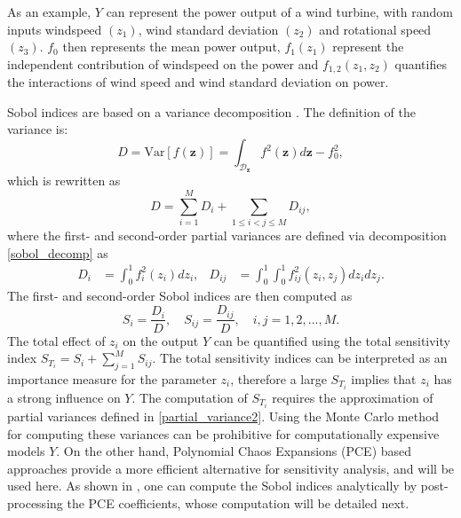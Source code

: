 As an example, $Y$ can represent the power output of a wind turbine, with random inputs windspeed $(z_1)$, wind standard deviation $(z_2)$ and rotational speed $(z_3)$. $f_0$ then represents the mean power output, $f_1(z_1)$ represent the independent contribution of windspeed on the power and $f_{1,2}(z_1,z_2)$ quantifies the interactions of wind speed and wind standard deviation on power. 

Sobol indices are based on a variance decomposition \cite{SOBOL2001271}. The definition of the variance is:
\begin{equation}\label{tot_var}
D = \text{Var}[f(\mathbf{z})] = \int_{\mathcal{D}_{\mathbf{z}}} f^2(\mathbf{z})d\mathbf{z} - f_0^2,
\end{equation}
which is rewritten as
\begin{equation}
D = \sum_{i=1}^M D_i + \sum_{1\leq i<j\leq M} D_{ij},
\end{equation}
where the first- and second-order partial variances are defined via decomposition \eqref{sobol_decomp} as
\begin{align}
D_i &= \int_{0}^{1} f^2_i(z_i)dz_i, & D_{ij} &= \int_{0}^{1} \int_{0}^{1} f^2_{ij}(z_i,z_j)dz_idz_j \label{partial_variance2}. 
\end{align}
The first- and second-order Sobol indices are then computed as
\begin{equation}\label{sobol_ind}
S_i = \frac{D_i}{D}, \quad S_{ij} = \frac{D_{ij}}{D}, \quad i,j=1,2, ..., M.
\end{equation}
The total effect of $z_i$ on the output $Y$ can be quantified using the total sensitivity index $S_{T_i} = S_i + \sum_{j=1}^M S_{ij}$. The total sensitivity indices can be interpreted as an importance measure for the parameter $z_i$, therefore a large $S_{T_i}$ implies that $z_i$ has a strong influence on $Y$. The computation of $S_{T_i}$ requires the approximation of partial variances defined in \eqref{partial_variance2}. Using the Monte Carlo method for computing these variances can be prohibitive for computationally expensive models $Y$. On the other hand, Polynomial Chaos Expansions (PCE) based approaches provide a more efficient alternative for sensitivity analysis, and will be used here. As shown in \cite{SUDRET2008964}, one can compute the Sobol indices analytically by post-processing the PCE coefficients, whose computation will be detailed next.

